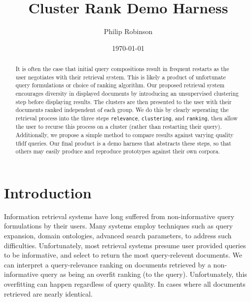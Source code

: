 \documentclass[10pt,twocolumn]{article} %
\title{Cluster Rank Demo Harness}
\date{\today}
\author{Philip Robinson}
\affil{Oregon Health Sciences University}
\begin{document}
\maketitle
{}
\begin{abstract}
  It is often the case that initial query compositions result in frequent restarts as
  the user negotiates with their retrieval system. This is likely a product of unfortunate
  query formulations or choice of ranking algorithm. Our proposed retrieval system
  encourages diversity in displayed documents by introducing an unsupervised clustering
  step before displaying results. The clusters are then presented to the user with their
  documents ranked independent of each group. We do this by clearly seperating the
  retrieval process into the three steps \texttt{relevance}, \texttt{clustering}, and
  \texttt{ranking}, then allow the user to recurse this process on a cluster (rather
  than restarting their query). Additionally, we propose a simple method to
  compare results against varying quality tfidf queries. Our final product is a demo
  harness that abstracts these steps, so that others may easily produce and reproduce
  prototypes against their own corpora.
\end{abstract}

\section{Introduction}
Information retrieval systems have long suffered from non-informative query formulations
by their users. Many systems employ techniques such as query expansion, domain ontologies,
advanced search parameters, to address such difficulties. Unfortunately, most retrieval
systems presume user provided queries to be informative, and select to return the most
query-relevent documents. We can interpret a query-relevance ranking on documents retrieved
by a non-informative query as being an overfit ranking (to the query). Unfortunately, this
overfitting can happen regardless of query quality. In cases where all documents retrieved
are nearly identical.
\end{document}
